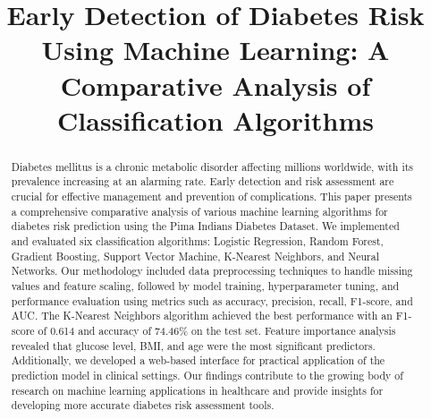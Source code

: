 \documentclass[conference]{IEEEtran}
\begin{document}
\title{Early Detection of Diabetes Risk Using Machine Learning: A Comparative Analysis of Classification Algorithms\\
}

\author{
\and
{}
\and
{}
}

\maketitle

\begin{abstract}
Diabetes mellitus is a chronic metabolic disorder affecting millions worldwide, with its prevalence increasing at an alarming rate. Early detection and risk assessment are crucial for effective management and prevention of complications. This paper presents a comprehensive comparative analysis of various machine learning algorithms for diabetes risk prediction using the Pima Indians Diabetes Dataset. We implemented and evaluated six classification algorithms: Logistic Regression, Random Forest, Gradient Boosting, Support Vector Machine, K-Nearest Neighbors, and Neural Networks. Our methodology included data preprocessing techniques to handle missing values and feature scaling, followed by model training, hyperparameter tuning, and performance evaluation using metrics such as accuracy, precision, recall, F1-score, and AUC. The K-Nearest Neighbors algorithm achieved the best performance with an F1-score of 0.614 and accuracy of 74.46\% on the test set. Feature importance analysis revealed that glucose level, BMI, and age were the most significant predictors. Additionally, we developed a web-based interface for practical application of the prediction model in clinical settings. Our findings contribute to the growing body of research on machine learning applications in healthcare and provide insights for developing more accurate diabetes risk assessment tools.
\end{abstract}
\end{document}
